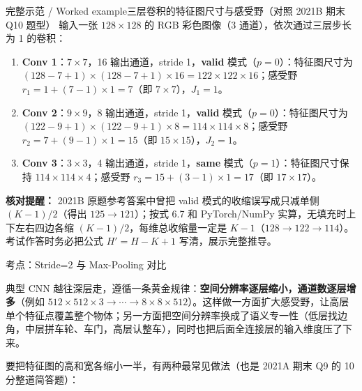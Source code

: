
\begin{StudyBlock}{完整示范 / Worked example}{三层卷积的特征图尺寸与感受野（对照 2021B 期末 Q10 题型）}
输入一张 $128\times 128$ 的 RGB 彩色图像（3 通道），依次通过三层步长为 1 的卷积：
\begin{enumerate}
\item \textbf{Conv 1}：$7\times 7$，16 输出通道，stride 1，\textbf{valid} 模式（$p=0$）：特征图尺寸为 $(128-7+1)\times(128-7+1)\times 16 = 122\times 122\times 16$；感受野 $r_1 = 1 + (7-1)\times 1 = 7$（即 $7\times 7$），$J_1=1$。
\item \textbf{Conv 2}：$9\times 9$，8 输出通道，stride 1，\textbf{valid} 模式（$p=0$）：特征图尺寸为 $(122-9+1)\times(122-9+1)\times 8 = 114\times 114\times 8$；感受野 $r_2 = 7 + (9-1)\times 1 = 15$（即 $15\times 15$），$J_2=1$。
\item \textbf{Conv 3}：$3\times 3$，4 输出通道，stride 1，\textbf{same} 模式（$p=1$）：特征图尺寸保持 $114\times 114\times 4$；感受野 $r_3 = 15 + (3-1)\times 1 = 17$（即 $17\times 17$）。
\end{enumerate}
\textbf{核对提醒：} 2021B 原题参考答案中曾把 valid 模式的收缩误写成只减单侧 $(K-1)/2$（得出 $125\to 121$）；按式 6.7 和 PyTorch/NumPy 实算，无填充时上下左右四边各缩 $(K-1)/2$，每维总收缩量一定是 $K-1$（$128\to 122\to 114$）。考试作答时务必把公式 $H' = H - K + 1$ 写清，展示完整推导。
\end{StudyBlock}


考点：Stride=2 与 Max-Pooling 对比 

典型 CNN 越往深层走，遵循一条黄金规律：\textbf{空间分辨率逐层缩小，通道数逐层增多}（例如 $512\times 512\times 3 \to \cdots \to 8\times 8\times 512$）。这样做一方面扩大感受野，让高层单个特征点覆盖整个物体；另一方面把空间分辨率换成了语义专一性（低层找边角，中层拼车轮、车门，高层认整车），同时也把后面全连接层的输入维度压了下来。

要把特征图的高和宽各缩小一半，有两种最常见做法（也是 2021A 期末 Q9 的 10 分整道简答题）：

